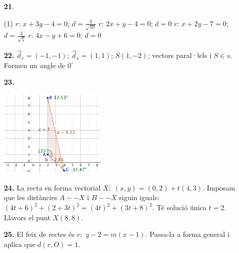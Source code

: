 \documentclass[a4paper, pdf, twoside]{book}
\begin{document}
\begin{multicols}{2}
\begin{enumerate}

 \item[\fontfamily{phv}\selectfont\color{blue}\textbf{21}. ] 
 \begin{tasks}[column-sep=1em, item-indent=1.3333em](1)
	 \task* $r:\,x+3y-4=0$; $d=\frac {3}{\sqrt {10}}$
	 \task $r:\,2x+y-4=0$; $d=0$
	 \task* $r:\,x+2y-7=0$; $d=\frac {3}{\sqrt {5}}$
	 \task $r:\,4x-y+6=0$; $d=0$ 
\end{tasks}
 \end{enumerate}
\begin{enumerate}
\vspace{0.25cm}
\item[\fontfamily{phv}\selectfont\color{blue}\textbf{22. }] 
$\vec d_r=(-1,-1)$; $\vec d_s=(1,1)$; $S(1,-2)$; vectors paral·lels i $S\in s$. Formen un angle de $0^\circ $ 
\vspace{0.25cm}
\item[\fontfamily{phv}\selectfont\color{blue}\textbf{23. }] 
\mbox {}\par \includegraphics [width=0.4\textwidth ]{img-sol/t9-21}
\vspace{0.25cm}
\item[\fontfamily{phv}\selectfont\color{blue}\textbf{24. }] 
La recta en forma vectorial $X:\; (x,y)=(0,2)+t(4,3)$. Imposam que les distàncies $A--X$ i $B--X$ siguin iguals: $(4t+6)^2+(2+3t)^2=(4t)^2+(3t+8)^2$. Té solució única $t=2$. Llavors el punt $X(8, 8)$.
\vspace{0.25cm}
\item[\fontfamily{phv}\selectfont\color{blue}\textbf{25. }]  \scalebox{0.6}{\simbolcompass } 
El feix de rectes és $r:$ $y-2=m(x-1)$. Passa-la a forma general i aplica que $d(r,O)=1$.
 \end{enumerate}
\vspace{0.3cm}



\end{multicols}
\end{document}
